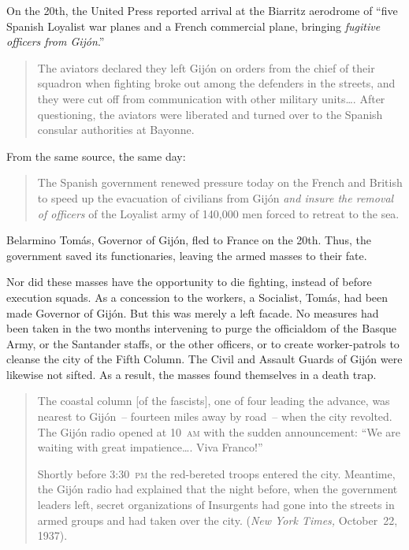 \medskip

On the 20th, the United Press reported arrival at the Biarritz aerodrome of ``five Spanish Loyalist war planes and a French commercial plane, bringing \emph{fugitive officers from Gij\'on}.\kn\kn'' 

\begin{quotation}
  The aviators declared they left Gij\'on on orders from the chief of their squadron when fighting broke out among the defenders in the streets, and they were cut off from communication with other military units\dots. After questioning, the aviators were liberated and turned over to the Spanish consular authorities at Bayonne.
\end{quotation}

\noindent
From the same source, the same day:

\begin{quotation}
  The Spanish government renewed pressure today on the French and British to speed up the evacuation of civilians from Gij\'on \emph{and insure the removal of officers} of the Loyalist army of 140,000 men forced to retreat to the sea.
\end{quotation}

Belarmino Tom\'as, Governor of Gij\'on, fled to France on the 20th. Thus, the government saved its functionaries, leaving the armed masses to their fate.

Nor did these masses have the opportunity to die fighting, instead of before execution squads. As a concession to the workers, a Socialist, Tom\'as, had been made Governor of Gij\'on. But this was merely a left facade. No measures had been taken in the two months intervening to purge the officialdom of the Basque Army, or the Santander staffs, or the other officers, or to create worker-patrols to cleanse the city of the Fifth Column. The Civil and Assault Guards of Gij\'on were likewise not sifted. As a result, the masses found themselves in a death trap.

\begin{quotation}
  The coastal column [of the fascists], one of four leading the advance, was nearest to Gij\'on~– fourteen miles away by road~– when the city revolted. The Gij\'on radio opened at 10~\textsc{am} with the sudden announcement: ``We are waiting with great impatience\dots. Viva Franco!''
  
  Shortly before 3:30~\textsc{pm} the red-bereted troops entered the city. Meantime, the Gij\'on radio had explained that the night before, when the government leaders left, secret organizations of Insurgents had gone into the streets in armed groups and had taken over the city. (\emph{New York Times,} October~22, 1937).
\end{quotation}

